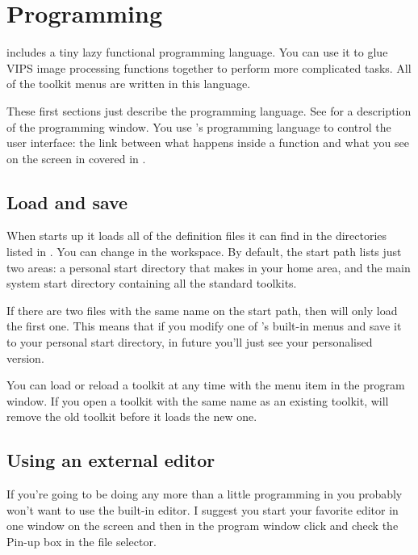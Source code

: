 \chapter{Programming}

\nip{} includes a tiny lazy functional programming language. You can use it to
glue VIPS image processing functions together to perform more complicated
tasks.  All of the \nip{} toolkit menus are written in this language.

These first sections just describe the programming language. See
 for a description of the programming window.  You use
\nip{}'s programming language to control the user interface: the link between
what happens inside a \nip{} function and what you see on the screen in
covered in .

\section{Load and save}

When \nip{} starts up it loads all of the definition files it can find in
the directories listed in . You can change 
in the  workspace. By default, the start path lists
just two areas: a personal start directory that \nip{} makes in your home
area, and the main system \nip{} start directory containing all the standard
toolkits.

If there are two files with the same name on the start path, then
\nip{} will only load the first one. This means that if you modify one
of \nip{}'s built-in menus and save it to your personal start directory,
in future you'll just see your personalised version. 

You can load or reload a toolkit at any time with the  menu item in the program window. If you open a toolkit with the same
name as an existing toolkit, \nip{} will remove the old toolkit before it
loads the new one. 

\section{Using an external editor}

If you're going to be doing any more than a little programming in \nip{} you
probably won't want to use the built-in editor. I suggest you start your
favorite editor in one window on the screen and then in the \nip{} program
window click  and check the Pin-up box in the file
selector.

